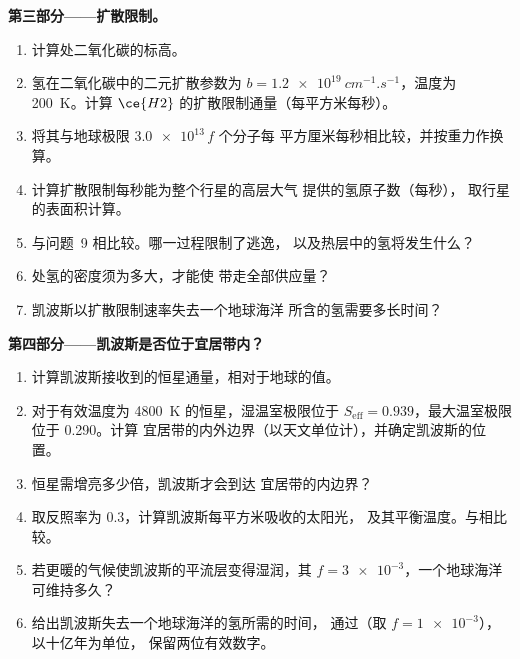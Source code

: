 \begin{problem}
\medskip\noindent\textbf{第三部分——扩散限制。}
\begin{enumerate}[resume]
\item 计算处二氧化碳的标高。
\item 氢在二氧化碳中的二元扩散参数为
  $b = \qty{1.2e19}{cm^{-1}.s^{-1}}$，温度为 \qty{200}{K}。计算
  $\ce{H2}$ 的扩散限制通量（每平方米每秒）。
\item 将其与地球极限 $\num{3.0e13}\,f$ 个分子每
  平方厘米每秒相比较，并按重力作换算。
\item 计算扩散限制每秒能为整个行星的高层大气
  提供的氢原子数（每秒），
  取行星的表面积计算。
\item 与问题~9 相比较。哪一过程限制了逃逸，
  以及热层中的氢将发生什么？
\item {}处氢的密度须为多大，才能使
  带走全部供应量？
\item 凯波斯以扩散限制速率失去一个地球海洋
  所含的氢需要多长时间？
\end{enumerate}

\medskip\noindent\textbf{第四部分——凯波斯是否位于宜居带内？}
\begin{enumerate}[resume]
\item 计算凯波斯接收到的恒星通量，相对于地球的值。
\item 对于有效温度为 \qty{4800}{K} 的恒星，湿温室极限位于
  $S_\mathrm{eff} = 0.939$，最大温室极限位于 0.290。计算
  宜居带的内外边界（以天文单位计），并确定凯波斯的位置。
\item 恒星需增亮多少倍，凯波斯才会到达
  宜居带的内边界？
\item 取反照率为 0.3，计算凯波斯每平方米吸收的太阳光，
  及其平衡温度。与相比较。
\item 若更暖的气候使凯波斯的平流层变得湿润，其
  $f = \num{3e-3}$，一个地球海洋可维持多久？
\item 给出凯波斯失去一个地球海洋的氢所需的时间，
  通过（取 $f = \num{1e-3}$），以十亿年为单位，
  保留两位有效数字。
\end{enumerate}
\end{problem}
